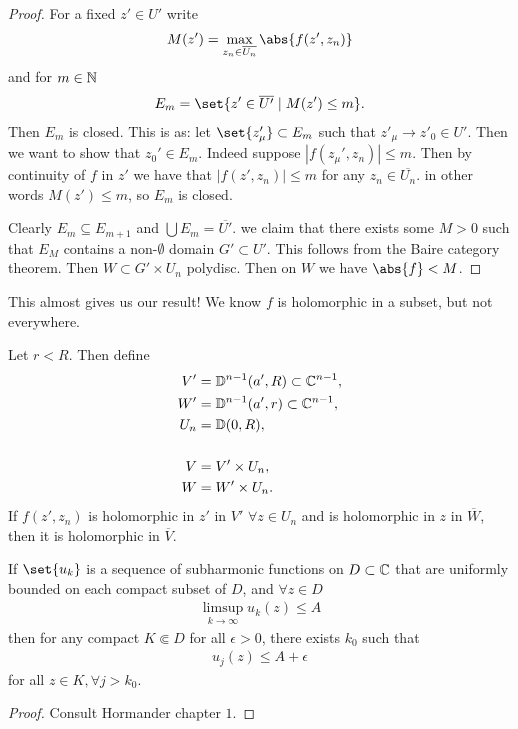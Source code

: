 \begin{proof}
    For a fixed $z' \in U'$ write
    \begin{align*}
        M(z') = \max_{z_n \in \overline{U_n}} \abs{f(z' , z_n)}
    \end{align*}
    and for $m \in \mathbb{N}$
    \begin{align*}
        E_m = \set{z' \in \overline{U'} \mid M(z') \leq m }.
    \end{align*}
    Then $E_m $ is closed. This is as: let $\set{z'_\mu } \subset E_m$ such that $z'_\mu \to z'_0 \in U'$. Then we want to show that $z_0' \in E_m$. Indeed suppose $|f(z_\mu' , z_n)| \leq m$. Then by continuity of $f$ in $z'$ we have that $|f(z' , z_n)| \leq m$ for any $z_n \in \overline{U_n}$. in other words $M(z') \leq m$, so $E_m$ is closed.

    Clearly $E_m \subseteq E_{m+1} $ and $\bigcup E_m = \overline{U'}$. we claim that there exists some $M>0$ such that $E_M$ contains a non-$\emptyset$ domain $G' \subset U'$. This follows from the Baire category theorem. Then $W \subset G' \times U_n$ polydisc. Then on $W$ we have $\abs{f} < M$.
\end{proof}

\begin{note}
    This almost gives us our result! We know $f$ is holomorphic in a subset, but not everywhere.
\end{note}

\begin{lemma}[Hartogs]\label{lemma:hartogs}
    Let $r< R$. Then define
    \begin{align*}
        V' &= \mathbb{D}^{n-1}(a',R) \subset \mathbb{C}^{n-1},\\
        W' &= \mathbb{D}^{n-1}(a',r) \subset \mathbb{C}^{n-1},\\
        U_n &= \mathbb{D}(0,R),\\\\
        V &= V' \times U_n,\\
        W &= W' \times U_n.
    \end{align*}
    If $f(z',z_n) $ is holomorphic in $z'$ in $V'$ $\forall z \in U_n$ and is holomorphic in $z$ in $\overline{W}$, then it is holomorphic in $\overline{V}$.
\end{lemma}

\begin{lemma}\label{lemma:hartogslemma3}
    If $\set{u_k}$ is a sequence of subharmonic functions on $D \subset \mathbb{C}$ that are uniformly bounded on each compact subset of $D$, and $\forall z \in D$
    \begin{align}\label{eq:subharmonic ubdd}
        \limsup_{k \to \infty} u_k(z) \leq A
    \end{align}
    then for any compact $K \Subset D$ for all $\epsilon > 0$, there exists $k_0$ such that
    \begin{align*}
        u_j(z) \leq A + \epsilon
    \end{align*}
    for all $z \in K, \forall j > k_0$.
\end{lemma}
\begin{proof}
    Consult Hormander chapter $1$.
\end{proof}

